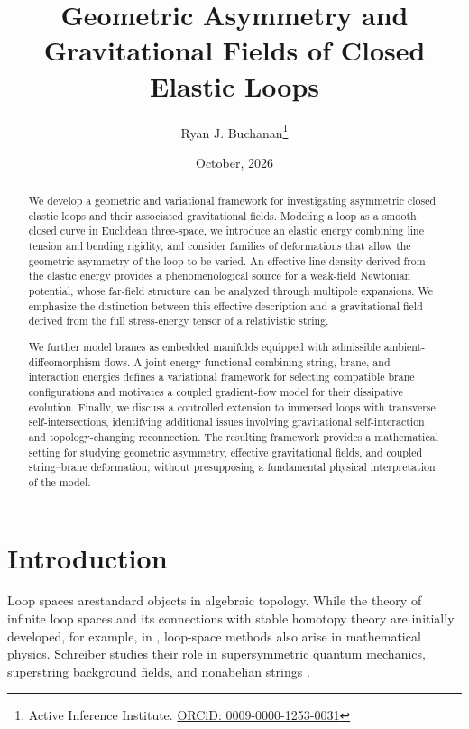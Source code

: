 \documentclass{article}
\title{Geometric Asymmetry and Gravitational Fields of Closed Elastic Loops}
\author{Ryan J. Buchanan\footnote{Active Inference Institute. \href{https://orcid.org/0009-0000-1253-0031}{ORCiD: 0009-0000-1253-0031}}}
\date{October, 2026}
\numberwithin{tm}{section}
\numberwithin{dn}{section}
\numberwithin{as}{section}
\numberwithin{rk}{section}
\numberwithin{lem}{section}
\numberwithin{ax}{section}
\numberwithin{pp}{section}
\numberwithin{eg}{section}
\numberwithin{war}{section}
\numberwithin{equation}{section}
\numberwithin{prop}{section}
\numberwithin{nt}{section}
\numberwithin{rc}{section}
\begin{document}
\maketitle


\begin{abstract}
	We develop a geometric and variational framework for investigating
	asymmetric closed elastic loops and their associated gravitational
	fields. Modeling a loop as a smooth closed curve in Euclidean
	three-space, we introduce an elastic energy combining line tension
	and bending rigidity, and consider families of deformations that
	allow the geometric asymmetry of the loop to be varied. An
	effective line density derived from the elastic energy provides a
	phenomenological source for a weak-field Newtonian potential, whose
	far-field structure can be analyzed through multipole expansions.
	We emphasize the distinction between this effective description
	and a gravitational field derived from the full stress-energy tensor
	of a relativistic string.
	
	We further model branes as embedded manifolds equipped with
	admissible ambient-diffeomorphism flows. A joint energy functional
	combining string, brane, and interaction energies defines a
	variational framework for selecting compatible brane configurations
	and motivates a coupled gradient-flow model for their dissipative
	evolution. Finally, we discuss a controlled extension to immersed
	loops with transverse self-intersections, identifying additional
	issues involving gravitational self-interaction and topology-changing
	reconnection. The resulting framework provides a mathematical
	setting for studying geometric asymmetry, effective gravitational
	fields, and coupled string--brane deformation, without presupposing
	a fundamental physical interpretation of the model.
\end{abstract}

\pagebreak

\tableofcontents

\section{Introduction}
Loop spaces arestandard objects in algebraic topology.
While the theory of infinite loop spaces and its connections with
stable homotopy theory are initially developed, for example, in
\cite{Adams}, loop-space methods also arise in mathematical physics.
Schreiber studies their role in supersymmetric quantum
mechanics, superstring background fields, and nonabelian
strings \cite{Schreiber}.
\end{document}
